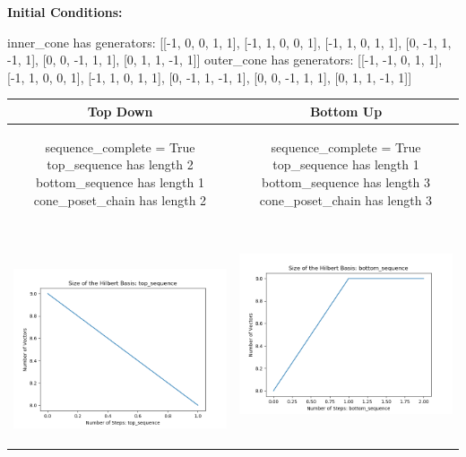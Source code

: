 \documentclass[10pt]{article}
\begin{document}
\textbf{Initial Conditions:}
\begin{SAGE}
inner_cone has generators: 
[[-1, 0, 0, 1, 1], [-1, 1, 0, 0, 1], [-1, 1, 0, 1, 1], [0, -1, 1, -1, 1], [0, 0, -1, 1, 1], [0, 1, 1, -1, 1]]
outer_cone has generators: 
[[-1, -1, 0, 1, 1], [-1, 1, 0, 0, 1], [-1, 1, 0, 1, 1], [0, -1, 1, -1, 1], [0, 0, -1, 1, 1], [0, 1, 1, -1, 1]]

\end{SAGE}
\begin{tabular}{c|c}
\textbf{Top Down} & \textbf{Bottom Up} \\ \hline  
\begin{SAGE}
	sequence_complete = True
	top_sequence has length 2
	bottom_sequence has length 1
	cone_poset_chain has length 2
\end{SAGE} 
&
\begin{SAGE}
	sequence_complete = True
	top_sequence has length 1
	bottom_sequence has length 3
	cone_poset_chain has length 3
\end{SAGE} 
\\ \hline
\
\begin{minipage}{.45\textwidth}
\includegraphics[width=\textwidth]{"DATA/5d/6 generators 1 bound F/top_sequence SIZE"}
\end{minipage} &
\begin{minipage}{.45\textwidth}
\includegraphics[width=\textwidth]{"DATA/5d/6 generators 1 bound F bottomup/bottom_sequence SIZE"}

\end{minipage}
\end{tabular}
\end{document}
